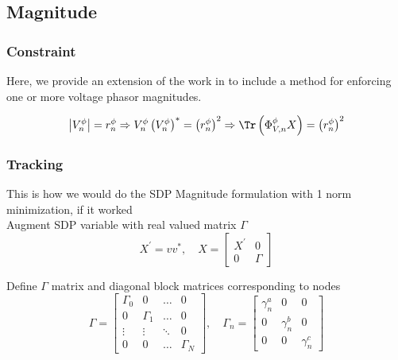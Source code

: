 \subsection{Magnitude}

\subsubsection{Constraint}

Here, we provide an extension of the work in \cite{dall2012optimization} to include a method for enforcing one or more voltage phasor magnitudes.

\begin{equation}
	\left| V_{n}^{\phi} \right| = r_{n}^{\phi} \Rightarrow V_{n}^{\phi} \left( V_{n}^{\phi} \right) ^{*} = \left( r_{n}^{\phi} \right)^{2} \Rightarrow \Tr \left( \Phi_{V,n}^{\phi} X \right) = \left( r_{n}^{\phi} \right)^{2}
\end{equation}

\subsubsection{Tracking}

This is how we would do the SDP Magnitude formulation with 1 norm minimization, if it worked \\

Augment SDP variable with real valued matrix $\Gamma$
\begin{equation}
	X^{'} = v v^{*},
    \quad
    X =
    \begin{bmatrix}
    	X^{'} & 0 \\
        0 & \Gamma
    \end{bmatrix}
\end{equation}

Define $\Gamma$ matrix and diagonal block matrices corresponding to nodes
\begin{equation}
    \Gamma = 
    \begin{bmatrix}
    	\Gamma_{0} & 0 & \hdots & 0 \\
        0 & \Gamma_{1} & \hdots & 0 \\
        \vdots & \vdots & \ddots & 0 \\
        0 & 0 & \hdots &\Gamma_{N}
    \end{bmatrix},
    \quad
    \Gamma_{n} = 
    \begin{bmatrix}
    	\gamma_{n}^{a} & 0 & 0 \\
        0 & \gamma_{n}^{b} & 0 \\
        0 & 0 & \gamma_{n}^{c}
    \end{bmatrix}
\end{equation}

